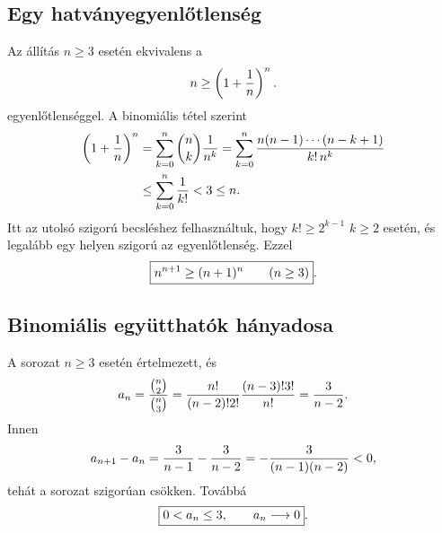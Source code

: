\documentclass{szb-solution}
\begin{document}
\subsection{Egy hatványegyenlőtlenség}

Az állítás $n\geq3$ esetén ekvivalens a
$$
  n\geq\left(1+\frac1n\right)^n
  \text.
$$
egyenlőtlenséggel. A binomiális tétel szerint
\begin{align*}
  \left(1+\frac1n\right)^n
  &=\sum_{k=0}^n\binom nk\frac1{n^k}
  =\sum_{k=0}^n
    \frac{n(n-1)\cdots(n-k+1)}{k!\,n^k}\\
  &\leq\sum_{k=0}^n\frac1{k!}
  <3
  \leq n
  \text.
\end{align*}
Itt az utolsó szigorú becsléshez felhasználtuk, hogy $k!\geq2^{k-1}$
$k\geq2$ esetén, és legalább egy helyen szigorú az egyenlőtlenség. Ezzel
$$
  \boxed{n^{n+1}\geq(n+1)^n\qquad(n\geq3)}
  \text.
$$

\subsection{Binomiális együtthatók hányadosa}

A sorozat $n\geq3$ esetén értelmezett, és
$$
  a_n=\frac{\binom n2}{\binom n3}
  =\frac{n!}{(n-2)!2!}\frac{(n-3)!3!}{n!}
  =\frac3{n-2}
  \text.
$$
Innen
$$
  a_{n+1}-a_n
  =\frac3{n-1}-\frac3{n-2}
  =-\frac3{(n-1)(n-2)}<0
  \text,
$$
tehát a sorozat szigorúan csökken. Továbbá
$$
  \boxed{0<a_n\leq3,\qquad a_n\longrightarrow0}
  \text.
$$
\end{document}

